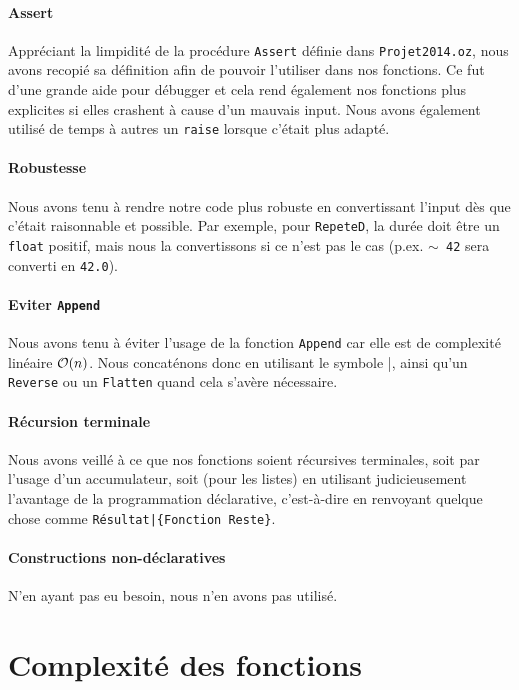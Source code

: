 \documentclass[a4paper,oneside,10pt]{article}
\newcommand{\fun}[1]{\texttt{#1}}
\newcommand{\bigO}[1]{$\mathcal{O(\text{$ #1 $})}$}
\begin{document}
\paragraph{Assert}
Appréciant la limpidité de la procédure \fun{Assert} définie dans \fun{Projet2014.oz}, nous avons recopié sa définition afin de pouvoir l'utiliser dans nos fonctions. Ce fut d'une grande aide pour débugger et cela rend également nos fonctions plus explicites si elles crashent à cause d'un mauvais input. Nous avons également utilisé de temps à autres un \fun{raise} lorsque c'était plus adapté.

\paragraph{Robustesse}
Nous avons tenu à rendre notre code plus robuste en convertissant l'input dès que c'était raisonnable et possible. Par exemple, pour \fun{RepeteD}, la durée doit être un \fun{float} positif, mais nous la convertissons si ce n'est pas le cas (p.ex. \fun{$\sim$ 42} sera converti en \fun{42.0}).

\paragraph{Eviter \fun{Append}}
Nous avons tenu à éviter l'usage de la fonction \fun{Append} car elle est de complexité linéaire \bigO{n}. Nous concaténons donc en utilisant le symbole |, ainsi qu'un \fun{Reverse} ou un \fun{Flatten} quand cela s'avère nécessaire.

\paragraph{Récursion terminale}
Nous avons veillé à ce que nos fonctions soient récursives terminales, soit par l'usage d'un accumulateur, soit (pour les listes) en utilisant judicieusement l'avantage de la programmation déclarative, c'est-à-dire en renvoyant quelque chose comme \fun{Résultat|\{Fonction Reste\}}.
	
\paragraph{Constructions non-déclaratives}
N'en ayant pas eu besoin, nous n'en avons pas utilisé.

\section{Complexité des fonctions}
\end{document}
